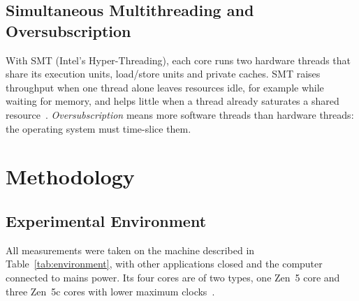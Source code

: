 \documentclass[conference,a4paper]{IEEEtran}
\begin{document}
\subsection{Simultaneous Multithreading and Oversubscription}
With SMT (Intel's Hyper-Threading), each core runs two hardware threads that
share its execution units, load/store units and private caches. SMT raises
throughput when one thread alone leaves resources idle, for example while
waiting for memory, and helps little when a thread already saturates a shared
resource~\cite{tullsen1995,hennessy2017}. \emph{Oversubscription} means more
software threads than hardware threads: the operating system must time-slice
them.

\section{Methodology}
\label{sec:method}

\subsection{Experimental Environment}
\label{sec:environment}
All measurements were taken on the machine described in
Table~\ref{tab:environment}, with other applications closed and the computer
connected to mains power. Its four cores are of two types, one Zen~5 core and
three Zen~5c cores with lower maximum clocks~\cite{nbc330}.
\end{document}
